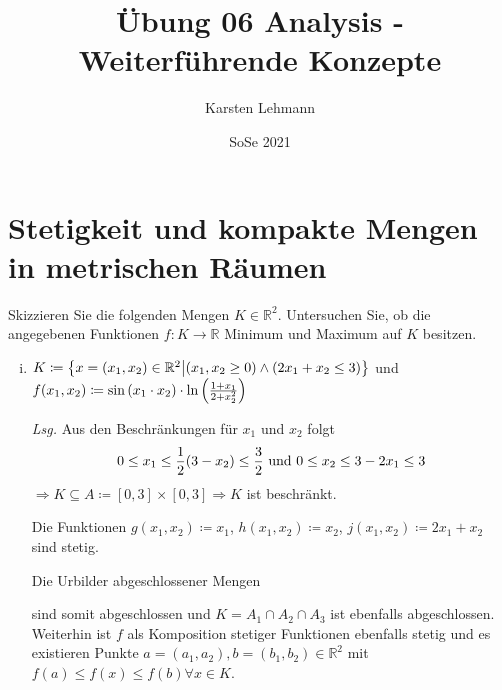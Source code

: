 \documentclass{scrreprt}
\author{Karsten Lehmann}
\date{SoSe 2021}
\title{Übung 06 Analysis - Weiterführende Konzepte}
\begin{document}
\section*{Stetigkeit und kompakte Mengen in metrischen Räumen}

Skizzieren Sie die folgenden Mengen $K \in \mathbb{R}^2$.
Untersuchen Sie, ob die angegebenen Funktionen $f: K \to \mathbb{R}$
Minimum und Maximum auf $K$ besitzen.
\begin{enumerate}[(i)]
\item $K \coloneqq \qty{x = \qty(x_1, x_2) \in \mathbb{R}^2 \middle|
    (x_1, x_2 \geq 0) \land (2x_1 + x_2 \leq 3)}$ und
  $f\qty(x_1, x_2) \coloneqq \sin\qty(x_1 \cdot x_2) \cdot
  \ln\qty(\frac{1 + x_1}{2 + x_2^2})$

  \textit{Lsg.} Aus den Beschränkungen für $x_1$ und $x_2$ folgt
  \[
    0 \leq x_1 \leq \frac{1}{2}\qty(3- x_2) \leq \frac{3}{2}
    \text{ und }
    0 \leq x_2 \leq 3 - 2x_1 \leq 3
  \]
  $\Rightarrow K \subseteq A \coloneqq [0, 3] \times [0, 3]
  \Rightarrow K$ ist beschränkt.

  \begin{center}
  \end{center}
  Die Funktionen $g(x_1, x_2) \coloneqq x_1$, $h(x_1, x_2) \coloneqq x_2$,
  $j(x_1, x_2) \coloneqq 2x_1 + x_2$ sind stetig.

  Die Urbilder abgeschlossener Mengen
  \begin{flalign*}
    A_1 &= g^{-1}([0, \infty)) = [0, \infty) \times {} & \\
    A_2 &= h^{-1}([0, \infty)) =  \times [0, \infty) \\
    A_3 &= j^{-1}((-\infty, 3]) = \qty{(x_1, x_2) \in \mathbb{R}^2 \middle|
      (x_1 \in \mathbb{R}) \land (x_2 \leq 3 - 2x_1)}
  \end{flalign*}
  sind somit abgeschlossen und
  $K = A_1 \cap A_2 \cap A_3$ ist ebenfalls abgeschlossen.
  Weiterhin ist $f$ als Komposition stetiger Funktionen ebenfalls stetig
  und es existieren Punkte $a = (a_1, a_2), b = (b_1, b_2) \in \mathbb{R}^2$
  mit $f(a) \leq f(x) \leq f(b) \forall x \in K$.


\end{enumerate}
\end{document}

